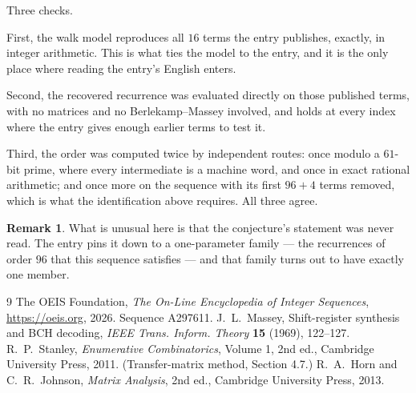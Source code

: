 \documentclass[11pt,a4paper]{article}
\theoremstyle{plain}
\theoremstyle{definition}
\newtheorem{remark}[theorem]{Remark}
\begin{document}
Three checks.

First, the walk model reproduces all $16$ terms the entry publishes, exactly, in integer
arithmetic. This is what ties the model to the entry, and it is the only place where reading
the entry's English enters.

Second, the recovered recurrence was evaluated directly on those published terms, with no
matrices and no Berlekamp--Massey involved, and holds at every index where the entry gives
enough earlier terms to test it.

Third, the order was computed twice by independent routes: once modulo a $61$-bit prime, where
every intermediate is a machine word, and once in exact rational arithmetic; and once more on
the sequence with its first $96+4$ terms removed, which is what the identification above
requires. All three agree.

\begin{remark}
What is unusual here is that the conjecture's statement was never read. The entry pins it down
to a one-parameter family --- the recurrences of order $96$ that this sequence satisfies
--- and that family turns out to have exactly one member.
\end{remark}

\begin{thebibliography}{9}
 The OEIS Foundation, \emph{The On-Line Encyclopedia of Integer
Sequences}, \url{https://oeis.org}, 2026. Sequence A297611.
 J.~L.~Massey, Shift-register synthesis and BCH decoding, \emph{IEEE
Trans. Inform. Theory} \textbf{15} (1969), 122--127.
 R.~P.~Stanley, \emph{Enumerative Combinatorics}, Volume 1, 2nd ed.,
Cambridge University Press, 2011. (Transfer-matrix method, Section 4.7.)
 R.~A.~Horn and C.~R.~Johnson, \emph{Matrix Analysis}, 2nd ed., Cambridge
University Press, 2013.
\end{thebibliography}
\end{document}
